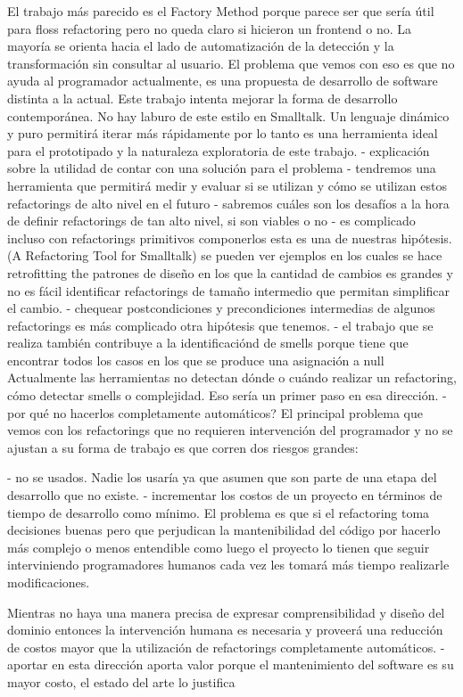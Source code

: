 El trabajo más parecido es el Factory Method porque parece ser que sería útil para floss refactoring pero no queda claro si hicieron un frontend o no. La mayoría se orienta hacia el lado de automatización de la detección y la transformación sin consultar al usuario. El problema que vemos con eso es que no ayuda al programador actualmente, es una propuesta de desarrollo de software distinta a la actual. Este trabajo intenta mejorar la forma de desarrollo contemporánea.
No hay laburo de este estilo en Smalltalk. Un lenguaje dinámico y puro permitirá iterar más rápidamente por lo tanto es una herramienta ideal para el prototipado y la naturaleza exploratoria de este trabajo.
    - explicación sobre la utilidad de contar con una solución para el problema
        - tendremos una herramienta que permitirá medir y evaluar si se utilizan y cómo se utilizan estos refactorings de alto nivel en el futuro
        - sabremos cuáles son los desafíos a la hora de definir refactorings de tan alto nivel, si son viables o no
        - es complicado incluso con refactorings primitivos componerlos
          esta es una de nuestras hipótesis. (A Refactoring Tool for Smalltalk) se pueden ver ejemplos en los cuales se hace retrofitting the patrones de diseño en los que la cantidad de cambios es grandes y no es fácil identificar refactorings de tamaño intermedio que permitan simplificar el cambio.
        - chequear postcondiciones y precondiciones intermedias de algunos refactorings es más complicado
          otra hipótesis que tenemos. 
    - el trabajo que se realiza también contribuye a la identificaciónd de smells porque tiene que encontrar todos los casos en los que se produce una asignación a null
      Actualmente las herramientas no detectan dónde o cuándo realizar un refactoring, cómo detectar smells o complejidad. Eso sería un primer paso en esa dirección.
    - por qué no hacerlos completamente automáticos?
      El principal problema que vemos con los refactorings que no requieren intervención del programador y no se ajustan a su forma de trabajo es que corren dos riesgos grandes:

- no se usados. Nadie los usaría ya que asumen que son parte de una etapa del desarrollo que no existe.
- incrementar los costos de un proyecto en términos de tiempo de desarrollo como mínimo. El problema es que si el refactoring toma decisiones buenas pero que perjudican la mantenibilidad del código por hacerlo más complejo o menos entendible como luego el proyecto lo tienen que seguir interviniendo programadores humanos cada vez les tomará más tiempo realizarle modificaciones.

Mientras no haya una manera precisa de expresar comprensibilidad y diseño del dominio entonces la intervención humana es necesaria y proveerá una reducción de costos mayor que la utilización de refactorings completamente automáticos.
    - aportar en esta dirección aporta valor porque el mantenimiento del software es su mayor costo, el estado del arte lo justifica
